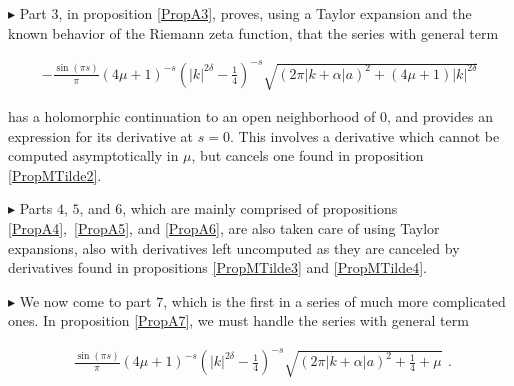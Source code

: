 \documentclass{jams-l}
\theoremstyle{definition}
\theoremstyle{remark}
\numberwithin{equation}{section}
\begin{document}
                
                \medskip
                
                \hspace{30pt} $\blacktriangleright$ Part $3$, in proposition \ref{PropA3}, proves, using a Taylor expansion and the known behavior of the Riemann zeta function, that the series with general term
                
                    \begin{equation}
                    \label{ThirdPart}
                        \begin{array}{c}
                            - \frac{\sin \left( \pi s \right)}{\pi} \left( 4 \mu+1 \right)^{-s} \left( \left \vert k \right \vert^{2 \delta} - \frac{1}{4} \right)^{-s} \sqrt{\left( 2 \pi \left \vert k + \alpha \right \vert a \right)^2 + \left( 4 \mu + 1 \right) \left \vert k \right \vert^{2 \delta}}
                        \end{array}
                    \end{equation}
                    
                    \noindent has a holomorphic continuation to an open neighborhood of $0$, and provides an expression for its derivative at $s=0$. This involves a derivative which cannot be computed asymptotically in $\mu$, but cancels one found in proposition \ref{PropMTilde2}.
                
                
                \medskip
                
                \hspace{30pt} $\blacktriangleright$ Parts $4$, $5$, and $6$, which are mainly comprised of propositions \ref{PropA4},~\ref{PropA5}, and \ref{PropA6}, are also taken care of using Taylor expansions, also with derivatives left uncomputed as they are canceled by derivatives found in propositions \ref{PropMTilde3} and \ref{PropMTilde4}.
                
                
                \medskip
                
                \hspace{30pt} $\blacktriangleright$ We now come to part $7$, which is the first in a series of much more complicated ones. In proposition \ref{PropA7}, we must handle the series with general term
                
                    \begin{equation}
                    \label{SeventhPart}
                        \begin{array}{c}
                            \frac{\sin \left( \pi s \right)}{\pi} \left( 4 \mu+1 \right)^{-s} \left( \left \vert k \right \vert^{2 \delta} - \frac{1}{4} \right)^{-s} \sqrt{\left( 2 \pi \left \vert k + \alpha \right \vert a \right)^2 + \frac{1}{4} + \mu}
                        \end{array} .
                    \end{equation}
                    
\end{document}
